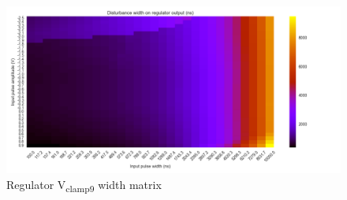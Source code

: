 \begin{figure}[!h]
  \centering
  \includegraphics[width=\textwidth]{src/4/figures/regulator_cz_v2_width.png}
  \caption{Regulator V\textsubscript{clamp9} width matrix}
  \label{fig:regu_width}
\end{figure}
